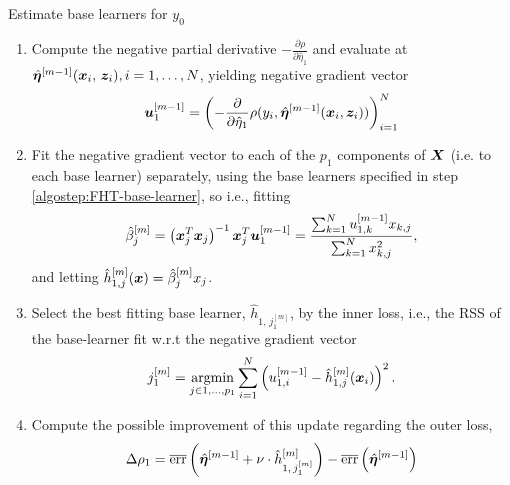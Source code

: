 \begin{algorithm}
\caption{Estimate base learners for $y_0$}
\label{algo:fhtboost-minor1}
\begin{enumerate}
    \item
        Compute the negative partial derivative $-\frac{\partial\rho}{\partial \hat{\eta}_1}$
        and evaluate at $\hat{\boldsymbol{\eta}}^{[m-1]}(\bm{x}_i,\,\bm{z}_i),i=1,\ldots,N$, yielding negative gradient vector
        \begin{equation*}
            \bm{u}^{[m-1]}_1=\left(-\frac{\partial}{\partial \hat{\eta}_1}\rho(y_i, \hat{\boldsymbol{\eta}}^{[m-1]}(\bm{x}_i,\bm{z}_i))\right)_{i=1}^N
        \end{equation*}
    \item
        Fit the negative gradient vector to each of the $p_1$ components of $\bm{X}$ (i.e. to each base learner) separately, using the base learners specified in step \ref{algostep:FHT-base-learner}, so i.e., fitting
        \begin{equation*}
            \hat{\beta}_j^{[m]}=\left(\bm{x}_j^T\bm{x}_j\right)^{-1}\bm{x}_j^T \bm{u}^{[m-1]}_1=\frac{\sum_{k=1}^N u^{[m-1]}_{1,k}x_{k,j}}{\sum_{k=1}^N x_{k,j}^2},
        \end{equation*}
        and letting $\hat{h}_{1,j}^{[m]}(\bm{x})=\hat{\beta}_j^{[m]}x_j$.
    \item
        Select the best fitting base learner, $\hat{h}_{1,\,j_1^{[m]}}$, by the inner loss,
        i.e., the RSS of the base-learner fit w.r.t the negative gradient vector
        \begin{equation*}
            j_1^{[m]}=\operatorname*{argmin}_{j\in 1,\ldots,p_1}\sum_{i=1}^N\left(u_{1,i}^{[m-1]}-\hat{h}^{[m]}_{1,j}(\bm{x}_i)\right)^2.
        \end{equation*}
    \item
        Compute the possible improvement of this update regarding the outer loss,
        \begin{equation*}
            \Delta\rho_1=\overline{\text{err}}\left(\hat{\boldsymbol{\eta}}^{[m-1]} + \nu \cdot \hat{h}^{[m]}_{1,\,j_1^{[m]}} \right)-\overline{\text{err}}\left(\hat{\boldsymbol{\eta}}^{[m-1]} \right)
        \end{equation*}
\end{enumerate}
\end{algorithm}

